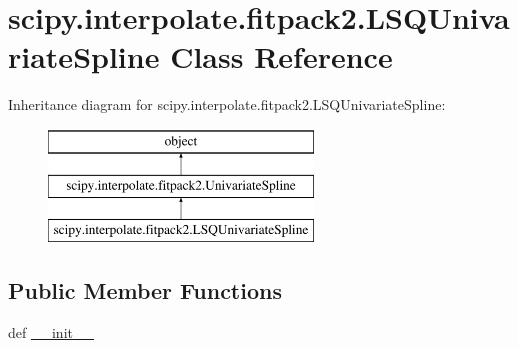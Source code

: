 \hypertarget{classscipy_1_1interpolate_1_1fitpack2_1_1LSQUnivariateSpline}{}\section{scipy.\+interpolate.\+fitpack2.\+L\+S\+Q\+Univariate\+Spline Class Reference}
\label{classscipy_1_1interpolate_1_1fitpack2_1_1LSQUnivariateSpline}
Inheritance diagram for scipy.\+interpolate.\+fitpack2.\+L\+S\+Q\+Univariate\+Spline\+:\begin{figure}[H]
\begin{center}
\leavevmode
\includegraphics[height=3.000000cm]{classscipy_1_1interpolate_1_1fitpack2_1_1LSQUnivariateSpline}
\end{center}
\end{figure}
\subsection*{Public Member Functions}
\begin{DoxyCompactItemize}
\item 
def \hyperlink{classscipy_1_1interpolate_1_1fitpack2_1_1LSQUnivariateSpline_a9ac6ef67521280296f2b6f44fbc8c536}{\+\_\+\+\_\+init\+\_\+\+\_\+}
\end{DoxyCompactItemize}


